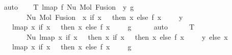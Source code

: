 \begin{isabellebody}
\ \ \ \ \isamarkupfalse%
\ auto\isanewline
\isanewline
\ \ \isamarkupfalse%
\ T{}{\isacharcolon}{\kern0pt}\ {\isachardoublequoteopen}lmap\ f\ {\isacharparenleft}{\kern0pt}Nu\ {\isacharparenleft}{\kern0pt}Mol\ {\isacharparenleft}{\kern0pt}Fusion\ {}\ y{\isacharparenright}{\kern0pt}\ g{\isacharparenright}{\kern0pt}{\isacharparenright}{\kern0pt}\ {\isacharequal}{\kern0pt}\isanewline
\ \ \ \ \ \ \ \ \ \ \ \ Nu\ {\isacharparenleft}{\kern0pt}Mol\ {\isacharparenleft}{\kern0pt}Fusion\ {}\ {\isacharparenleft}{\kern0pt}{\isacharparenleft}{\kern0pt}{\isasymlambda}x{\isachardot}{\kern0pt}\ if\ x\ {\isacharequal}{\kern0pt}\ {}\ then\ x\ else\ f\ {\isacharparenleft}{\kern0pt}x\ {\isacharminus}{\kern0pt}\ {}{\isacharparenright}{\kern0pt}\ {\isacharplus}{\kern0pt}\ {}{\isacharparenright}{\kern0pt}\ y{\isacharparenright}{\kern0pt}{\isacharparenright}{\kern0pt}\isanewline
\ \ \ \ \ \ \ \ {\isacharparenleft}{\kern0pt}lmap\ {\isacharparenleft}{\kern0pt}{\isasymlambda}x{\isachardot}{\kern0pt}\ if\ x\ {\isacharequal}{\kern0pt}\ {}\ then\ x\ else\ f\ {\isacharparenleft}{\kern0pt}x\ {\isacharminus}{\kern0pt}\ {}{\isacharparenright}{\kern0pt}\ {\isacharplus}{\kern0pt}\ {}{\isacharparenright}{\kern0pt}\ g{\isacharparenright}{\kern0pt}{\isacharparenright}{\kern0pt}{\isachardoublequoteclose}\isanewline
\ \ \ \ \isamarkupfalse%
\ auto\isanewline
\ \ \isamarkupfalse%
\ \isamarkupfalse%
\ T{}{\isacharcolon}{\kern0pt}\ {\isachardoublequoteopen}{\isachardot}{\kern0pt}{\isachardot}{\kern0pt}{\isachardot}{\kern0pt}\ {\isasymsimeq}\isanewline
\ \ \ \ \ \ \ \ \ \ \ \ Nu\ {\isacharparenleft}{\kern0pt}lmap\ {\isacharparenleft}{\kern0pt}{\isasymlambda}x{\isachardot}{\kern0pt}\ if\ x\ {\isacharequal}{\kern0pt}\ {}\ then\ {\isacharparenleft}{\kern0pt}{\isasymlambda}x{\isachardot}{\kern0pt}\ if\ x\ {\isacharequal}{\kern0pt}\ {}\ then\ x\ else\ f\ {\isacharparenleft}{\kern0pt}x\ {\isacharminus}{\kern0pt}\ {}{\isacharparenright}{\kern0pt}\ {\isacharplus}{\kern0pt}\ {}{\isacharparenright}{\kern0pt}\ y\ else\ x{\isacharparenright}{\kern0pt}\isanewline
\ \ \ \ \ \ \ \ {\isacharparenleft}{\kern0pt}lmap\ {\isacharparenleft}{\kern0pt}{\isasymlambda}x{\isachardot}{\kern0pt}\ if\ x\ {\isacharequal}{\kern0pt}\ {}\ then\ x\ else\ f\ {\isacharparenleft}{\kern0pt}x\ {\isacharminus}{\kern0pt}\ {}{\isacharparenright}{\kern0pt}\ {\isacharplus}{\kern0pt}\ {}{\isacharparenright}{\kern0pt}\ g{\isacharparenright}{\kern0pt}{\isacharparenright}{\kern0pt}{\isachardoublequoteclose}\isanewline

\end{isabellebody}
